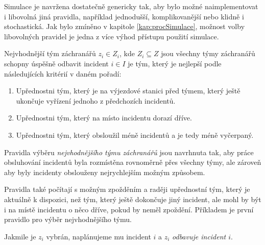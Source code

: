 Simulace je navržena dostatečně genericky tak, aby bylo možné naimplementovat i libovolná jiná pravidla, například jednodušší, komplikovanější nebo klidně i stochastická.
Jak bylo zmíněno v kapitole \ref{kap:procSimulace}, možnost volby libovolných pravidel je jedna z více výhod přístupu použití simulace.
\begin{definice}\label{df:simulacePravidla2}
  Nejvhodnější tým záchranářů $z_i \in Z_i$, kde $Z_i \subseteq Z$ jsou všechny týmy záchranářů schopny úspěšně odbavit incident $i \in I$ je tým,
  který je nejlepší podle následujících kritérií v daném pořadí:
  \begin{enumerate}
    \item Upřednostni tým, který je na výjezdové stanici před týmem, který ještě ukončuje vyřízení jednoho z předchozích incidentů. 
    \item Upřednostni tým, který na místo incidentu dorazí dříve. 
    \item Upřednostni tým, který obsloužil méně incidentů a je tedy méně vyčerpaný.
  \end{enumerate}
\end{definice}
Pravidla výběru \textit{nejvhodnějšího týmu záchranářů} jsou navrhnuta tak,
aby práce obsluhování incidentů byla rozmístěna rovnoměrně přes všechny týmy, ale zároveň aby byly incidenty obslouženy nejrychlejším možným způsobem.

Pravidla také počítají s možným zpožděním a raději upřednostní tým, který je aktuálně k dispozici, než tým, který ještě dokončuje jiný incident,
ale mohl by být i na místě incidentu o něco dříve, pokud by neměl zpoždění. Příkladem je první pravidlo pro výběr nejvhodnějšího týmu.

Jakmile je $z_i$ vybrán, naplánujeme mu incident $i$ a $z_i$ \textit{odbavuje incident $i$}.

\clearpage

